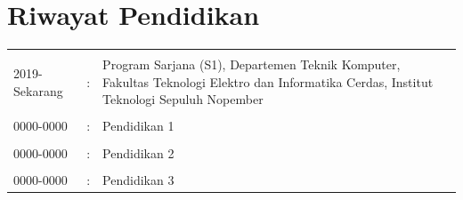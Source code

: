 \section*{Riwayat Pendidikan}
\begin{tabular}{p{3cm}cp{9cm}}
	&&\\
	2019-Sekarang  & :&
		Program Sarjana (S1), Departemen Teknik Komputer, Fakultas Teknologi Elektro dan Informatika Cerdas, Institut Teknologi  Sepuluh Nopember\\
	&&\\
	0000-0000  & :&
		Pendidikan 1\\
	&&\\
	0000-0000  & :&
		Pendidikan 2\\
	&&\\
	0000-0000  & :&
		Pendidikan 3\\
\end{tabular}